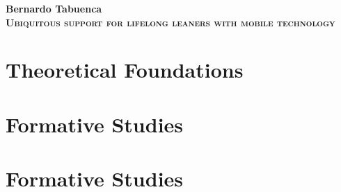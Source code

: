 \documentclass[a4paper,12pt,twoside,openright]{book}
\begin{document}
\nocite{*} %

\begin{titlepage}
	\null\vfill
	\center
		\Large
		\textbf{Bernardo Tabuenca}\\
		\vspace*{1em}
	\Huge
	\textbf{\textsc{Ubiquitous support for lifelong leaners with mobile technology}}\\
	\vfill\null
	
	\clearpage{\pagestyle{empty}\cleardoublepage}
\end{titlepage}
	
\frontmatter	
	\tableofcontents
	
	\cleardoublepage
	\listoffigures
	
	\cleardoublepage	
	\listoftables
	
	
	\clearpage{\pagestyle{empty}\cleardoublepage}
	\pagestyle{fancy}
	
\mainmatter
	
	
		\clearpage{\pagestyle{empty}\cleardoublepage}

	\part{Theoretical Foundations}
		
			\clearpage{\pagestyle{empty}\cleardoublepage}
	\part{Formative Studies}
		
			\clearpage{\pagestyle{empty}\cleardoublepage}




			
	\part{Formative Studies}
		
			\clearpage{\pagestyle{empty}\cleardoublepage}			


	

	
		\clearpage{\pagestyle{empty}\cleardoublepage}	
	
\backmatter

	\renewcommand{\bibname}{References}
	
	\clearpage{\pagestyle{empty}\cleardoublepage}

	
		\clearpage{\pagestyle{empty}\cleardoublepage}
\end{document}
